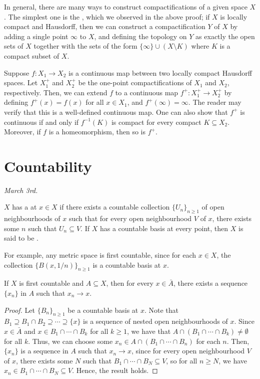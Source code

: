 In general, there are many ways to construct compactifications of a given space $X$. The simplest one is the , which we observed in the above proof; if $X$ is locally compact and Hausdorff, then we can construct a compactification $Y$ of $X$ by adding a single point $\infty$ to $X$, and defining the topology on $Y$ as exactly the open sets of $X$ together with the sets of the form $\{\infty\} \cup (X \setminus K)$ where $K$ is a compact subset of $X$.

Suppose $f:X_{1} \to X_{2}$ is a continuous map between two locally compact Hausdorff spaces. Let $X_{1}^{+}$ and $X_{2}^{+}$ be the one-point compactifications of $X_{1}$ and $X_{2}$, respectively. Then, we can extend $f$ to a continuous map $f^{+} : X_{1}^{+} \to X_{2}^{+}$ by defining $f^{+}(x) = f(x)$ for all $x \in X_{1}$, and $f^{+}(\infty) = \infty$. The reader may verify that this is a well-defined continuous map. One can also show that $f^{+}$ is continuous if and only if $f^{-1}(K)$ is compact for every compact $K \subseteq X_{2}$. Moreover, if $f$ is a homeomorphism, then so is $f^{+}$.

\section{Countability}
\textit{March 3rd.}

\begin{definition}
    $X$ has a  at $x \in X$ if there exists a countable collection $\{U_{n}\}_{n \geq 1}$ of open neighbourhoods of $x$ such that for every open neighbourhood $V$ of $x$, there exists some $n$ such that $U_{n} \subseteq V$. If $X$ has a countable basis at every point, then $X$ is said to be .
\end{definition}

For example, any metric space is first countable, since for each $x \in X$, the collection $\{B(x,1/n)\}_{n \geq 1}$ is a countable basis at $x$.

\begin{lemma}
    If $X$ is first countable and $A \subseteq X$, then for every $x \in \bar{A}$, there exists a sequence $\{x_{n}\}$ in $A$ such that $x_{n} \to x$.
\end{lemma}

\begin{proof}
    Let $\{B_{n}\}_{n \geq 1}$ be a countable basis at $x$. Note that $B_{1} \supseteq B_{1} \cap B_{2} \supseteq \cdots \supseteq \{x\}$ is a sequence of nested open neighbourhoods of $x$. Since $x \in \bar{A}$ and $x \in B_{1} \cap \cdots \cap B_{k}$ for all $k \geq 1$, we have that $A \cap (B_{1} \cap \cdots \cap B_{k}) \neq \emptyset$ for all $k$. Thus, we can choose some $x_{n} \in A \cap (B_{1} \cap \cdots \cap B_{n})$ for each $n$. Then, $\{x_{n}\}$ is a sequence in $A$ such that $x_{n} \to x$, since for every open neighbourhood $V$ of $x$, there exists some $N$ such that $B_{1} \cap \cdots \cap B_{N} \subseteq V$, so for all $n \geq N$, we have $x_{n} \in B_{1} \cap \cdots \cap B_{N} \subseteq V$. Hence, the result holds.
\end{proof}

